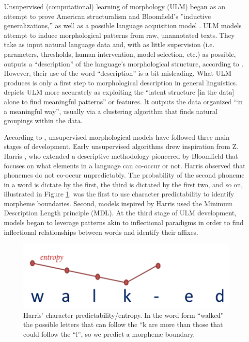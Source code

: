 \documentclass[12pt]{article}
\begin{document}
Unsupervised (computational) learning of morphology (ULM) began as an attempt to prove American structuralism and Bloomfield's ''inductive generalizations,'' as well as a possible language acquisition model \cite{hammarstrom_unsupervised_2011}. ULM models attempt to induce morphological patterns from raw, unannotated texts. They take as input natural language data and, with as little supervision (i.e. parameters, thresholds, human intervention, model selection, etc.) as possible, outputs a ``description'' of the language’s morphological structure, according to . However, their use of the word “description” is a bit misleading. What ULM produces is only a first step to morphological description in general linguistics.  depicts ULM more accurately as exploiting the ``latent structure [in the data] alone to find meaningful patterns'' or features. It outputs the data organized ``in a meaningful way'', usually via a clustering algorithm that finds natural groupings within the data. 

According to , unsupervised morphological models have followed three main stages of development. Early unsupervised algorithms drew inspiration from Z. Harris \cite{harris_phoneme_1955,harris_morpheme_1967}, who extended a descriptive methodology pioneered by Bloomfield that focuses on what elements in a language can co-occur or not. Harris observed that phonemes do not co-occur unpredictably. The probability of the second phoneme in a word is dictate by the first, the third is dictated by the first two, and so on, illustrated in Figure \ref{fig:harris}.  was the first to use character predictability to identify morpheme boundaries. Second, models inspired by Harris used the Minimum Description Length principle (MDL). At the third stage of ULM development, models began to leverage patterns akin to inflectional paradigms in order to find inflectional relationships between words and identify their affixes.

\begin{figure}[ht]
\begin{center}
\includegraphics[width=0.5\columnwidth]{Harris-Entropy-image.PNG}
\caption{Harris' character predictability/entropy. In the word form ``walked" the possible letters that can follow the ``k are more than those that could follow the ``l'', so we predict a morpheme boundary.}
\label{fig:harris}
\end{center}
\end{figure}
\end{document}
